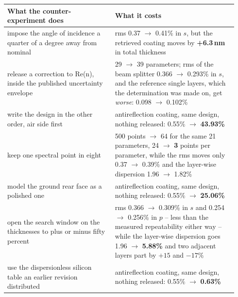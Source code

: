 \begin{table}[htbp]
\begin{tabular}{p{0.44\linewidth}p{0.50\linewidth}}
\hline
What the counter-experiment does & What it costs \\
\hline
impose the angle of incidence a quarter of a degree away from nominal & rms 0.37 $\rightarrow$ 0.41\% in $s$, but the retrieved coating moves by \textbf{+6.3\,nm} in total thickness \\
release a correction to Re(n), inside the published uncertainty envelope & 29 $\rightarrow$ 39 parameters; rms of the beam splitter 0.366 $\rightarrow$ 0.293\% in $s$, and the reference single layers, which the determination was made on, get \emph{worse}: 0.098 $\rightarrow$ 0.102\% \\
write the design in the other order, air side first & antireflection coating, same design, nothing released: 0.55\% $\rightarrow$ \textbf{43.93\%} \\
keep one spectral point in eight & 500 points $\rightarrow$ 64 for the same 21 parameters, 24 $\rightarrow$ \textbf{3} points per parameter, while the rms moves only 0.37 $\rightarrow$ 0.39\% and the layer-wise dispersion 1.96 $\rightarrow$ 1.82\% \\
model the ground rear face as a polished one & antireflection coating, same design, nothing released: 0.55\% $\rightarrow$ \textbf{25.06\%} \\
open the search window on the thicknesses to plus or minus fifty percent & rms 0.366 $\rightarrow$ 0.309\% in $s$ and 0.254 $\rightarrow$ 0.256\% in $p$ -- less than the measured repeatability either way -- while the layer-wise dispersion goes 1.96 $\rightarrow$ \textbf{5.88\%} and two adjacent layers part by $+15$ and $-17\%$ \\
use the dispersionless silicon table an earlier revision distributed & antireflection coating, same design, nothing released: 0.55\% $\rightarrow$ \textbf{0.63\%} \\
\hline
\end{tabular}
\end{table}
